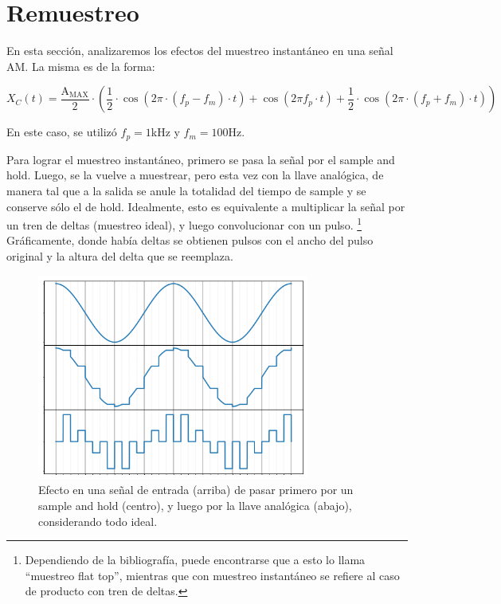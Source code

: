 \documentclass[a4paper]{article}
\begin{document}
\section{Remuestreo} \label{sec:remuestreo}

En esta secci\'on, analizaremos los efectos del muestreo instant\'aneo en una se\~nal AM. La misma es de la forma:

\begin{equation}
	X_C(t) = \frac{\mathrm{A}_\mathrm{MAX}}{2} \cdot 
	\left(  \frac{1}{2} \cdot \cos{\left( 2\pi \cdot(f_p-f_m) \cdot t\right)} +
	\cos{\left( 2\pi f_p\cdot t\right)} +
	\frac{1}{2} \cdot \cos{\left( 2\pi \cdot (f_p+f_m)\cdot t\right)}
	\right)
\end{equation}

En este caso, se utiliz\'o $f_p=1$kHz y $f_m=100$Hz.  

Para lograr el muestreo instant\'aneo, primero se pasa la se\~nal por el sample and hold. Luego, se la vuelve a muestrear, pero esta vez con la llave anal\'ogica, de manera tal que a la salida se anule la totalidad del tiempo de sample y se conserve s\'olo el de hold. Idealmente, esto es equivalente a multiplicar la se\~nal por un tren de deltas (muestreo ideal), y luego convolucionar con un pulso.
\footnote{Dependiendo de la bibliograf\'ia, puede encontrarse que a esto lo llama ``muestreo flat top'', mientras que con muestreo instant\'aneo se refiere al caso de producto con tren de deltas.}
Gr\'aficamente, donde hab\'ia deltas se obtienen pulsos con el ancho del pulso original y la altura del delta que se reemplaza. 


\begin{figure}[htb]
	\centering
	\includegraphics[width=0.8\textwidth]{muestreo_inst.png}
	\caption{Efecto en una se\~nal de entrada (arriba) de pasar primero por un sample and hold (centro), y luego por la llave anal\'ogica (abajo), considerando todo ideal.}
	\label{fig:muestreo_inst}
\end{figure}
\end{document}
